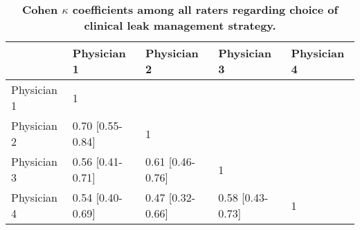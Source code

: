 \begin{table*}[htbp]
\centering
\caption{\bf Cohen $\kappa$ coefficients among all raters regarding choice of clinical leak management strategy.}
\begin{tableminipage}{\textwidth}
\begin{tabularx}{\textwidth}{XXXXX}
\hline
 &  Physician 1 & Physician 2 & Physician 3 & Physician 4\\
\hline
Physician 1 & 1 & & &\\
Physician 2 & 0.70 [0.55-0.84] & 1 & &\\
Physician 3 & 0.56 [0.41-0.71] & 0.61 [0.46-0.76] & 1 &\\
Physician 4 & 0.54 [0.40-0.69] & 0.47 [0.32-0.66] & 0.58 [0.43-0.73] & 1\\

\hline
\end{tabularx}
  \label{tab:cohen}
\end{tableminipage}
\end{table*}





